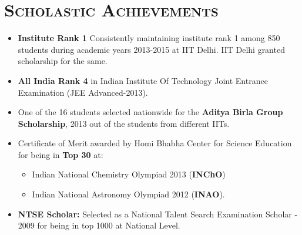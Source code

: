 \documentclass{article}
\newcommand{\tmpsection}[1]{}
\let\tmpsection=\section
\renewcommand{\section}[1]{\tmpsection*{\textsc{#1}}}
\begin{document}
\section{Scholastic Achievements}
\begin{itemize}
\setlength\itemsep{0em}
\item \textbf{Institute Rank 1}  Consistently maintaining institute rank 1 among 850 students during academic years 2013-2015 at IIT Delhi. IIT Delhi granted scholarship for the same.  
    \item \textbf{All India Rank 4} in Indian Institute Of Technology Joint Entrance Examination (JEE Advanced-2013).
    
    \item One of the 16 students selected nationwide for the \textbf{Aditya Birla Group Scholarship}, 2013 out of the students from different IITs.
    \item Certificate of Merit awarded by Homi Bhabha Center for Science Education for being in \textbf{Top 30} at:
        \begin{itemize}
    \setlength\itemsep{0em}
        \item Indian National Chemistry Olympiad 2013 (\textbf{INChO}) 
        \item Indian National Astronomy Olympiad 2012 (\textbf{INAO}).
        \end{itemize}
    \item \textbf{NTSE Scholar:} Selected as a National Talent Search Examination Scholar - 2009 for being in top 1000 at National Level.
\end{itemize}
\end{document}
